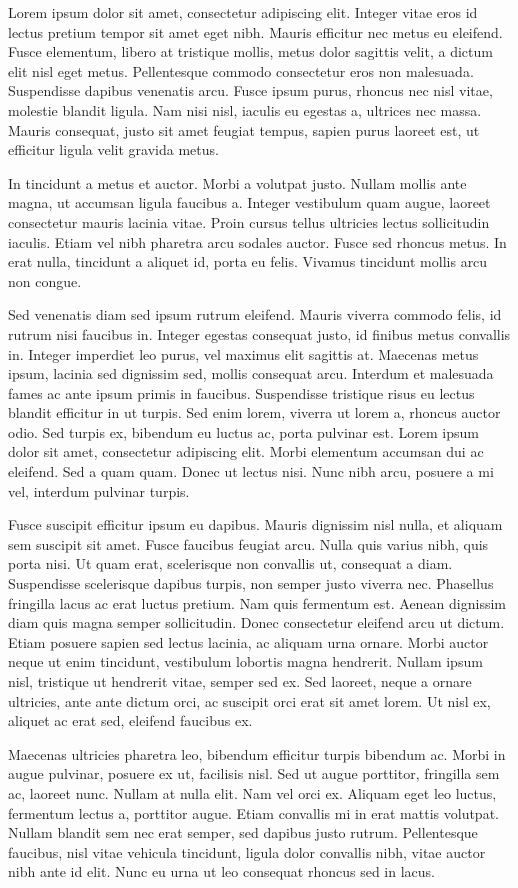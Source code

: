 \documentclass[12pt, twocolumn]{article}
\begin{document}
Lorem ipsum dolor sit amet, consectetur adipiscing elit. Integer vitae eros id lectus pretium tempor sit amet eget nibh. Mauris efficitur nec metus eu eleifend. Fusce elementum, libero at tristique mollis, metus dolor sagittis velit, a dictum elit nisl eget metus. Pellentesque commodo consectetur eros non malesuada. Suspendisse dapibus venenatis arcu. Fusce ipsum purus, rhoncus nec nisl vitae, molestie blandit ligula. Nam nisi nisl, iaculis eu egestas a, ultrices nec massa. Mauris consequat, justo sit amet feugiat tempus, sapien purus laoreet est, ut efficitur ligula velit gravida metus.

In tincidunt a metus et auctor. Morbi a volutpat justo. Nullam mollis ante magna, ut accumsan ligula faucibus a. Integer vestibulum quam augue, laoreet consectetur mauris lacinia vitae. Proin cursus tellus ultricies lectus sollicitudin iaculis. Etiam vel nibh pharetra arcu sodales auctor. Fusce sed rhoncus metus. In erat nulla, tincidunt a aliquet id, porta eu felis. Vivamus tincidunt mollis arcu non congue.

Sed venenatis diam sed ipsum rutrum eleifend. Mauris viverra commodo felis, id rutrum nisi faucibus in. Integer egestas consequat justo, id finibus metus convallis in. Integer imperdiet leo purus, vel maximus elit sagittis at. Maecenas metus ipsum, lacinia sed dignissim sed, mollis consequat arcu. Interdum et malesuada fames ac ante ipsum primis in faucibus. Suspendisse tristique risus eu lectus blandit efficitur in ut turpis. Sed enim lorem, viverra ut lorem a, rhoncus auctor odio. Sed turpis ex, bibendum eu luctus ac, porta pulvinar est. Lorem ipsum dolor sit amet, consectetur adipiscing elit. Morbi elementum accumsan dui ac eleifend. Sed a quam quam. Donec ut lectus nisi. Nunc nibh arcu, posuere a mi vel, interdum pulvinar turpis.

Fusce suscipit efficitur ipsum eu dapibus. Mauris dignissim nisl nulla, et aliquam sem suscipit sit amet. Fusce faucibus feugiat arcu. Nulla quis varius nibh, quis porta nisi. Ut quam erat, scelerisque non convallis ut, consequat a diam. Suspendisse scelerisque dapibus turpis, non semper justo viverra nec. Phasellus fringilla lacus ac erat luctus pretium. Nam quis fermentum est. Aenean dignissim diam quis magna semper sollicitudin. Donec consectetur eleifend arcu ut dictum. Etiam posuere sapien sed lectus lacinia, ac aliquam urna ornare. Morbi auctor neque ut enim tincidunt, vestibulum lobortis magna hendrerit. Nullam ipsum nisl, tristique ut hendrerit vitae, semper sed ex. Sed laoreet, neque a ornare ultricies, ante ante dictum orci, ac suscipit orci erat sit amet lorem. Ut nisl ex, aliquet ac erat sed, eleifend faucibus ex.

Maecenas ultricies pharetra leo, bibendum efficitur turpis bibendum ac. Morbi in augue pulvinar, posuere ex ut, facilisis nisl. Sed ut augue porttitor, fringilla sem ac, laoreet nunc. Nullam at nulla elit. Nam vel orci ex. Aliquam eget leo luctus, fermentum lectus a, porttitor augue. Etiam convallis mi in erat mattis volutpat. Nullam blandit sem nec erat semper, sed dapibus justo rutrum. Pellentesque faucibus, nisl vitae vehicula tincidunt, ligula dolor convallis nibh, vitae auctor nibh ante id elit. Nunc eu urna ut leo consequat rhoncus sed in lacus. 
\end{document}
